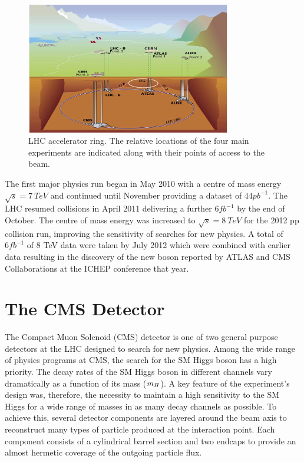 \begin{figure}[htb!]
\begin{center}
\includegraphics[width=0.8\textwidth]{detector/CERN.jpg}
\caption{LHC accelerator ring. The relative locations of the four main experiments 
are indicated along with their points of access to the beam.}
\label{fig:lhcring}
\end{center}
\end{figure}

The first major physics run began in May 2010 with a centre of mass energy 
$\sqrt{s}=7~TeV$ and continued until November providing a dataset of $44pb^{-1}$.
The LHC resumed collisions in April 2011 delivering a further $6fb^{-1}$ by the end
of October. The centre of mass energy was increased to $\sqrt{s}=8~TeV$ for the 2012 pp 
collision run, improving the sensitivity of searches for new physics. A total of
$6fb^{-1}$ of 8 TeV data were taken by July 2012 which were combined with earlier data resulting
in the discovery of the new boson reported by ATLAS and CMS Collaborations at the ICHEP conference that year. 

\section{The CMS Detector}
\label{sec:cmsdetector}
The Compact Muon Solenoid (CMS) detector is one of two general purpose detectors at 
the LHC designed to search for new physics. 
Among the wide range of physics programs at CMS, the search for the SM Higgs boson 
has a high priority. The decay rates of the SM Higgs boson in different 
channels vary dramatically as a function of its mass ($m_{H}$). A key feature of the experiment's design
was, therefore, the necessity to maintain a high sensitivity to the SM Higgs for a wide range of masses in as many 
decay channels as possible. To achieve this, several detector components are layered around 
the beam axis to reconstruct many types of particle produced at the interaction point.
Each component consists of a cylindrical barrel section and two endcaps 
to provide an almost hermetic coverage of the outgoing particle flux.


